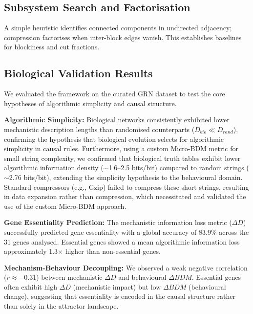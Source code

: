 \documentclass[11pt]{article}
\begin{document}
\subsection{Subsystem Search and Factorisation}
A simple heuristic identifies connected components in undirected adjacency; compression factorises when inter-block edges vanish. This establishes baselines for blockiness and cut fractions.
\begin{center}
\end{center}

\subsection{Biological Validation Results}
We evaluated the framework on the curated GRN dataset to test the core hypotheses of algorithmic simplicity and causal structure.

\textbf{Algorithmic Simplicity:} Biological networks consistently exhibited lower mechanistic description lengths than randomised counterparts ($D_{bio} \ll D_{rand}$), confirming the hypothesis that biological evolution selects for algorithmic simplicity in causal rules. Furthermore, using a custom Micro-BDM metric for small string complexity, we confirmed that biological truth tables exhibit lower algorithmic information density ($\sim$1.6--2.5 bits/bit) compared to random strings ($\sim$2.76 bits/bit), extending the simplicity hypothesis to the behavioural domain. Standard compressors (e.g., Gzip) failed to compress these short strings, resulting in data expansion rather than compression, which necessitated and validated the use of the custom Micro-BDM approach.

\textbf{Gene Essentiality Prediction:} The mechanistic information loss metric ($\Delta D$) successfully predicted gene essentiality with a global accuracy of 83.9\% across the 31 genes analysed. Essential genes showed a mean algorithmic information loss approximately 1.3$\times$ higher than non-essential genes.

\textbf{Mechanism-Behaviour Decoupling:} We observed a weak negative correlation ($r \approx -0.31$) between mechanistic $\Delta D$ and behavioural $\Delta BDM$. Essential genes often exhibit high $\Delta D$ (mechanistic impact) but low $\Delta BDM$ (behavioural change), suggesting that essentiality is encoded in the causal structure rather than solely in the attractor landscape.
\end{document}
